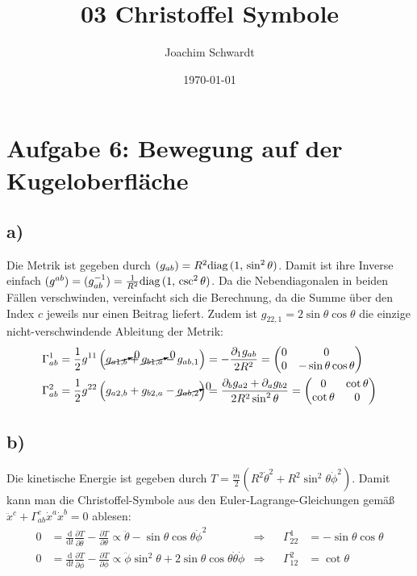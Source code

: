 \documentclass[a4paper,12pt]{article}
\newcommand{\kla}{}
\newcommand{\tecxt}{}
\begin{document}
\title{03 Christoffel Symbole}
\author{Joachim Schwardt}
\date{\today}
\maketitle

\section*{Aufgabe 6: Bewegung auf der Kugeloberfläche}
\subsection*{a)}Die Metrik ist gegeben durch $(g_{ab})=R^2\tecxt\text{diag\,}(1,\,\sin^2\theta)$. Damit ist ihre Inverse einfach $(g^{ab})=(g^{-1}_{ab})=\frac{1}{R^2}\tecxt\text{diag\,}(1,\,\csc^2\theta)$. Da die Nebendiagonalen in beiden Fällen verschwinden, vereinfacht sich die Berechnung, da die Summe über den Index $c$ jeweils nur einen Beitrag liefert. Zudem ist $g_{22,1}=2\sin\theta\cos\theta$ die einzige nicht-verschwindende Ableitung der Metrik:
\begin{align}
\Gamma^1_{ab}&=\frac{1}{2}g^{11}\kla\left( {\cancelto{0}{g_{a1,b}}+\cancelto{0}{g_{b1,a}}-g_{ab,1}} \right)=-\frac{\partial_1g_{ab}}{2R^2}=\begin{pmatrix}
0&0 \\ 0&-\sin\theta\cos\theta
\end{pmatrix}\\
\Gamma^2_{ab}&=\frac{1}{2}g^{22}\kla\left( {g_{a2,b}+g_{b2,a}-\cancelto{0}{g_{ab,2}}} \right)=\frac{\partial_bg_{a2}+\partial_ag_{b2}}{2R^2\sin^2\theta}=\begin{pmatrix}
0&\cot\theta \\ \cot\theta & 0
\end{pmatrix}
\end{align}
\subsection*{b)}Die kinetische Energie ist gegeben durch $T=\frac{m}{2}(R^2\dot{\theta}^2+R^2\sin^2\theta\dot{\phi}^2)$. Damit kann man die Christoffel-Symbole aus den Euler-Lagrange-Gleichungen gemäß $\ddot{x}^c+\Gamma^c_{ab}\dot{x}^a\dot{x}^b=0$ ablesen:
\begin{align}
0&=\frac{\tecxt\text{d}}{\tecxt\text{d}t}\frac{\partial T}{\partial\dot{\theta}}-\frac{\partial T}{\partial \theta}\propto \ddot{\theta}-\sin\theta\cos\theta\dot{\phi}^2&\Rightarrow&&\Gamma^1_{22}&=-\sin\theta\cos\theta\\
0&=\frac{\tecxt\text{d}}{\tecxt\text{d}t}\frac{\partial T}{\partial\dot{\phi}}-\frac{\partial T}{\partial \phi}\propto \ddot{\phi}\sin^2\theta+2\sin\theta\cos\theta\dot{\theta}\dot{\phi}&\Rightarrow&&\Gamma^2_{12}&=\cot\theta
\end{align}
\end{document}
